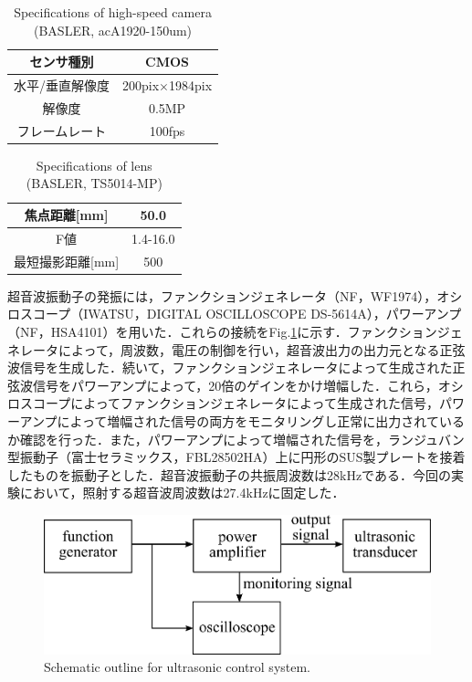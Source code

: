 \begin{table}[h]
    \centering
    \caption{Specifications of high-speed camera (BASLER, acA1920-150um)}
    \label{table:camera}
    \begin{tabular}{c|c}\hline
        センサ種別      & CMOS                  \\ \hline
        水平/垂直解像度 & 200pix$\times$1984pix \\ \hline
        解像度          & 0.5MP                 \\ \hline
        フレームレート  & 100fps                \\ \hline
    \end{tabular}
\end{table}
\clearpage

\begin{table}[ht]
    \centering
    \caption{Specifications of lens (BASLER, TS5014-MP)}
    \label{table:lens}
    \begin{tabular}{c|c}\hline
        焦点距離[mm]     & 50.0     \\ \hline
        F値              & 1.4-16.0 \\ \hline
        最短撮影距離[mm] & 500      \\ \hline
    \end{tabular}
\end{table}

超音波振動子の発振には，ファンクションジェネレータ（NF，WF1974），オシロスコープ（IWATSU，DIGITAL OSCILLOSCOPE DS-5614A），パワーアンプ（NF，HSA4101）を用いた．これらの接続をFig.\ref{fig:connect-with-signal}に示す．ファンクションジェネレータによって，周波数，電圧の制御を行い，超音波出力の出力元となる正弦波信号を生成した．続いて，ファンクションジェネレータによって生成された正弦波信号をパワーアンプによって，20倍のゲインをかけ増幅した．これら，オシロスコープによってファンクションジェネレータによって生成された信号，パワーアンプによって増幅された信号の両方をモニタリングし正常に出力されているか確認を行った．また，パワーアンプによって増幅された信号を，ランジュバン型振動子（富士セラミックス，FBL28502HA）上に円形のSUS製プレートを接着したものを振動子とした．超音波振動子の共振周波数は28kHzである．今回の実験において，照射する超音波周波数は27.4kHzに固定した．

\begin{figure}[h]
    \centering
    \includegraphics[clip,width=13.0cm]{2-Methods/connect-with-signal.png}
    \caption{Schematic outline for ultrasonic control system.}
    \label{fig:connect-with-signal}
\end{figure}

